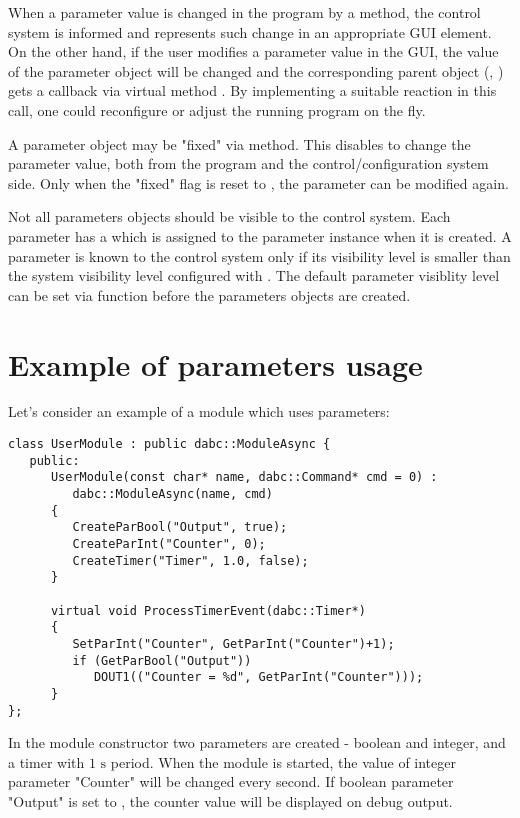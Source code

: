 When a parameter value is changed in the program by a  method, 
the control system is informed and represents such change in an appropriate GUI element.
On the other hand, if the user modifies a parameter value in the GUI, 
the value of the parameter object will be changed and the corresponding parent object 
(, ) gets a callback via 
virtual method . 
By implementing a suitable reaction in this call, 
one could reconfigure or adjust the running program on the fly.

A parameter object may be "fixed" via  method. 
This disables to change the parameter value, both
from the program and the control/configuration system side. 
Only when the "fixed" flag is reset to ,
the parameter can be modified again.

Not all parameters objects should be visible to the control system. 
Each parameter has a  
which is assigned to the parameter instance when it is created.
A parameter is known to the control system only if its 
visibility level is smaller than the system visibility level 
configured with . 
The default parameter visiblity level can be set via
 function before 
the parameters objects are created.


\section{Example of parameters usage}
\label{prog_setup_parameterexample}
Let's consider an example of a module which uses parameters:

\begin{verbatim}
class UserModule : public dabc::ModuleAsync {
   public:
      UserModule(const char* name, dabc::Command* cmd = 0) : 
         dabc::ModuleAsync(name, cmd)
      {
         CreateParBool("Output", true);
         CreateParInt("Counter", 0);
         CreateTimer("Timer", 1.0, false);
      }
      
      virtual void ProcessTimerEvent(dabc::Timer*)
      {
         SetParInt("Counter", GetParInt("Counter")+1);
         if (GetParBool("Output")) 
            DOUT1(("Counter = %d", GetParInt("Counter")));
      }
}; 
\end{verbatim}

In the module constructor two parameters are created - boolean and integer, 
and a timer with $1\mbox{~s}$ period.
When the module is started, the value of integer parameter "Counter" 
will be changed every second.
If boolean parameter "Output" is set to , 
the counter value will be displayed on debug output.

